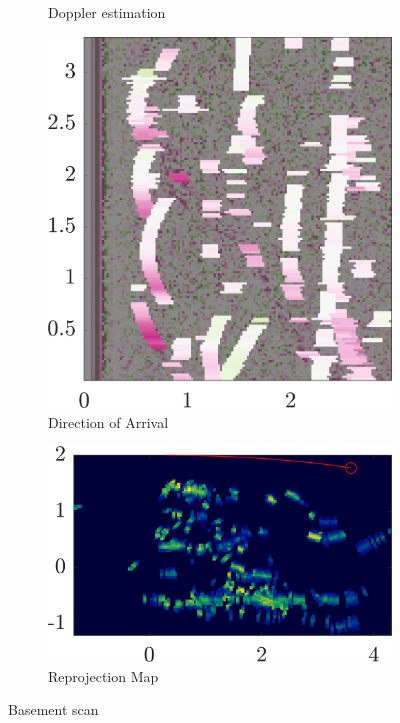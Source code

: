 \begin{figure}
\begin{subfigure}[b]{0.25\textwidth}
        \caption{\small Doppler estimation}
    \end{subfigure}%
    \begin{subfigure}[b]{0.25\textwidth}   
        \centering 
        \includegraphics[width=.9\textwidth]{gfx/results/basement_doa.png}
        \caption{\small Direction of Arrival}
    \end{subfigure}%
    \begin{subfigure}[b]{0.25\textwidth}   
        \centering 
        \includegraphics[width=.9\textwidth]{gfx/results/basement_reprojection.png}
        \caption{\small Reprojection Map}
    \end{subfigure}%
    \caption{Basement scan}
\end{figure}

